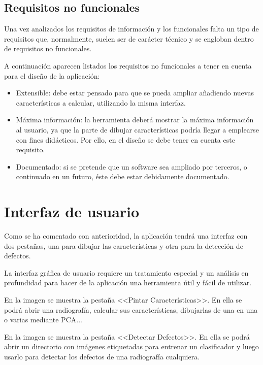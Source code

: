 \newpage
\subsection{Requisitos no funcionales}
Una vez analizados los requisitos de información y los funcionales falta un tipo de requisitos que, normalmente, suelen ser de carácter técnico y se engloban dentro de requisitos no funcionales.

A continuación aparecen listados los requisitos no funcionales a tener en cuenta para el diseño de la aplicación:

\begin{itemize}
 \item Extensible: debe estar pensado para que se pueda ampliar añadiendo nuevas características a calcular, utilizando la misma interfaz.
 \item Máxima información: la herramienta deberá mostrar la máxima información al usuario, ya que la parte de dibujar características podría llegar a emplearse con fines didácticos. Por ello, en el diseño se debe tener en cuenta este requisito.
 \item Documentado: si se pretende que un software sea ampliado por terceros, o continuado en un futuro, éste debe estar debidamente documentado.
\end{itemize}
\newpage


\section{Interfaz de usuario}
Como se ha comentado con anterioridad, la aplicación tendrá una interfaz con dos pestañas, una para dibujar las características y otra para la detección de defectos.

La interfaz gráfica de usuario requiere un tratamiento especial y un análisis en profundidad para hacer de la aplicación una herramienta útil y fácil de utilizar.

En la imagen  se muestra la pestaña <<Pintar Características>>. En ella se podrá abrir una radiografía, calcular sus características, dibujarlas de una en una o varias mediante PCA...


En la imagen  se muestra la pestaña <<Detectar Defectos>>. En ella se podrá abrir un directorio con imágenes etiquetadas para entrenar un clasificador y luego usarlo para detectar los defectos de una radiografía cualquiera.

